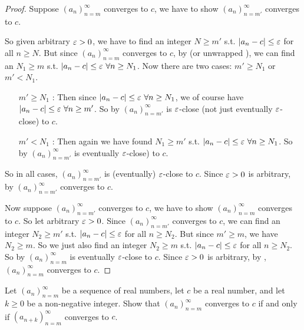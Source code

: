 \begin{proof}
Suppose \((a_n)_{n = m}^{\infty}\) converges to \(c\), we have to show \((a_n)_{n = m'}^{\infty}\) converges to \(c\).

So given arbitrary \(\varepsilon > 0\), we have to find an integer \(N \ge m'\) s.t. \(\lvert a_n - c\rvert \le \varepsilon\) for all \(n \ge N\).
But since \((a_n)_{n = m}^{\infty}\) converges to \(c\), by (or unwrapped ), we can find an \(N_1 \ge m\) s.t. \(\lvert a_n - c\rvert \le \varepsilon\ \forall n \ge N_1\).
Now there are two cases: \(m' \ge N_1\) or \(m' < N_1\).
\begin{itemize}
    \item[\(m' \ge N_1\)]:
        Then since \(\lvert a_n - c\rvert \le \varepsilon\ \forall n \ge N_1\), we of course have \(\lvert a_n - c\rvert \le \varepsilon\ \forall n \ge m'\).
        So by  \((a_n)_{n = m'}^{\infty}\) is \(\varepsilon\)-close (not just eventually \(\varepsilon\)-close) to \(c\).
    \item[\(m' < N_1\)]:
        Then again we have found \(N_1 \ge m'\) s.t. \(\lvert a_n - c\rvert \le \varepsilon\ \forall n \ge N_1\).
        So by  \((a_n)_{n = m'}^{\infty}\) is eventually \(\varepsilon\)-close) to \(c\).
\end{itemize}
So in all cases, \((a_n)_{n = m'}^{\infty}\) is (eventually) \(\varepsilon\)-close to \(c\).
Since \(\varepsilon > 0\) is arbitrary, by  \((a_n)_{n = m'}^{\infty}\) converges to \(c\).

Now suppose \((a_n)_{n = m'}^{\infty}\) converges to \(c\), we have to show \((a_n)_{n = m}^{\infty}\) converges to \(c\).
So let arbitrary \(\varepsilon > 0\).
Since \((a_n)_{n = m'}^{\infty}\) converges to \(c\), we can find an integer \(N_2 \ge m'\) s.t. \(\lvert a_n - c\rvert \le \varepsilon\) for all \(n \ge N_2\).
But since \(m' \ge m\), we have \(N_2 \ge m\).
So we just also find an integer \(N_2 \ge m\) s.t. \(\lvert a_n - c\rvert \le \varepsilon\) for all \(n \ge N_2\).
So by  \((a_n)_{n = m}^{\infty}\) is eventually \(\varepsilon\)-close to \(c\).
Since \(\varepsilon > 0\) is arbitrary, by , \((a_n)_{n = m}^{\infty}\) converges to \(c\).
\end{proof}

\begin{exercise} \label{exercise 6.1.4}
Let \((a_n)_{n = m}^{\infty}\) be a sequence of real numbers, let \(c\) be a real number, and let \(k \ge 0\) be a non-negative integer.
Show that \((a_n)_{n = m}^{\infty}\) converges to \(c\) if and only if \((a_{n + k})_{n = m}^{\infty}\) converges to \(c\).
\end{exercise}

